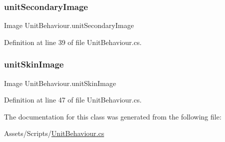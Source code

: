 \subsubsection{\texorpdfstring{unitSecondaryImage}{unitSecondaryImage}}
{\footnotesize\ttfamily Image Unit\+Behaviour.\+unit\+Secondary\+Image\hspace{0.3cm}{\ttfamily [get]}}



Definition at line 39 of file Unit\+Behaviour.\+cs.

\mbox{\label{class_unit_behaviour_a8e85eeaf7ce34b0b04a96258aacf02d7}} 
\subsubsection{\texorpdfstring{unitSkinImage}{unitSkinImage}}
{\footnotesize\ttfamily Image Unit\+Behaviour.\+unit\+Skin\+Image\hspace{0.3cm}{\ttfamily [get]}}



Definition at line 47 of file Unit\+Behaviour.\+cs.



The documentation for this class was generated from the following file\+:\begin{DoxyCompactItemize}
\item 
Assets/\+Scripts/\mbox{\hyperlink{_unit_behaviour_8cs}{Unit\+Behaviour.\+cs}}\end{DoxyCompactItemize}
